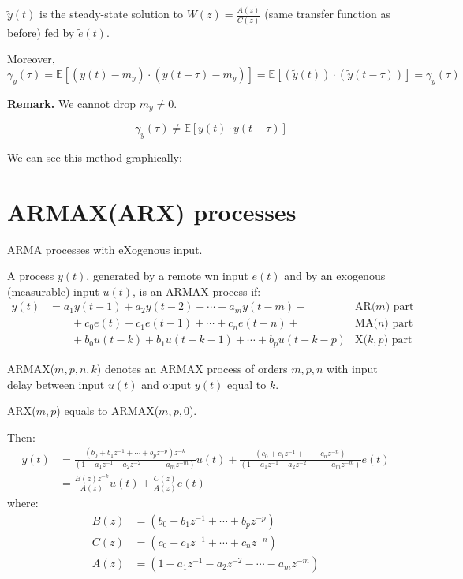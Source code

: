 $\tilde{y}(t)$ is the steady-state solution to $W(z)=\frac{A(z)}{C(z)}$ (same transfer function as before) fed by $\tilde{e}(t)$.

Moreover,
$$
\gamma_{y}(\tau)=\mathbb{E}\left[\left(y(t)-m_{y}\right) \cdot\left(y(t-\tau)-m_{y}\right)\right]=\mathbb{E}[(\tilde{y}(t)) \cdot(\tilde{y}(t-\tau))]=\gamma_{\tilde{y}}(\tau)
$$

\textbf{Remark.} We cannot drop $m_{y} \neq 0$.

$$\quad \gamma_{y}(\tau) \neq \mathbb{E}[y(t) \cdot y(t-\tau)]$$

We can see this method graphically:


\section{ARMAX(ARX) processes}
ARMA processes with eXogenous input.

A process $y(t)$, generated by a remote \gls{wn} input $e(t)$ and by an exogenous (measurable) input $u(t)$, is an ARMAX process if:
\begin{align*}
	y(t)&=a_{1} y(t-1)+a_{2} y(t-2)+\cdots+a_{m} y(t-m)+ &\text{AR($m$) part}\\
	&\qquad+c_{0} e(t)+c_{1} e(t-1)+\cdots+c_{n} e(t-n)+ &\text{MA($n$) part} \\
	&\qquad+b_{0} u(t-k)+b_{1} u(t-k-1)+\cdots+b_{p} u(t-k-p)  &\text{X($k,p$) part}
\end{align*}

ARMAX($m,p,n,k$) denotes an ARMAX process of orders $m,p,n$ with input delay between input $u(t)$ and ouput $y(t)$ equal to $k$.

ARX($m,p$) equals to ARMAX($m,p,0$).

Then:
\begin{align*}
	y(t) &= \frac{\left(b_{0}+b_{1} z^{-1}+\cdots+b_{p} z^{-p}\right) z^{-k}}{\left(1-a_{1} z^{-1}-a_{2} z^{-2}-\cdots-a_{m} z^{-m}\right)} u(t)+\frac{\left(c_{0}+c_{1} z^{-1}+\cdots+c_{n} z^{-n}\right)}{\left(1-a_{1} z^{-1}-a_{2} z^{-2}-\cdots-a_{m} z^{-m}\right)} e(t)\\
	&=\frac{B(z) z^{-k}}{A(z)} u(t)+\frac{C(z)}{A(z)} e(t)
\end{align*}
where:
\begin{align*}
	B(z) &= \left(b_{0}+b_{1} z^{-1}+\cdots+b_{p} z^{-p}\right)\\
	C(z) &= \left(c_{0}+c_{1} z^{-1}+\cdots+c_{n} z^{-n}\right)\\
	A(z) &= \left(1-a_{1} z^{-1}-a_{2} z^{-2}-\cdots-a_{m} z^{-m}\right)
\end{align*}

